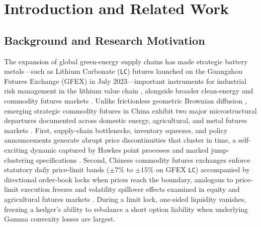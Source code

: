 \documentclass[11pt,a4paper]{article}
\begin{document}
\section{Introduction and Related Work}
\label{sec:intro}

\subsection{Background and Research Motivation}
The expansion of global green-energy supply chains has made strategic battery metals---such as Lithium Carbonate (\texttt{LC}) futures launched on the Guangzhou Futures Exchange (GFEX) in July 2023---important instruments for industrial risk management in the lithium value chain \citep{Kong2024,Wang2025}, alongside broader clean-energy and commodity futures markets \citep{Coskun2023}. Unlike frictionless geometric Brownian diffusion \citep{Black1976}, emerging strategic commodity futures in China exhibit two major microstructural departures documented across domestic energy, agricultural, and metal futures markets \citep{Naqvi2023,Geng2025}. First, supply-chain bottlenecks, inventory squeezes, and policy announcements generate abrupt price discontinuities \citep{Merton1976,Kou2002} that cluster in time, a self-exciting dynamic captured by Hawkes point processes \citep{Hawkes1971,Bacry2015,Brignone2023} and marked jump-clustering specifications \citep{ChenClements2024,Mercuri2024}. Second, Chinese commodity futures exchanges enforce statutory daily price-limit bands ($\pm 7\%$ to $\pm 15\%$ on GFEX \texttt{LC}) accompanied by directional order-book locks when prices reach the boundary, analogous to price-limit execution freezes and volatility spillover effects examined in equity and agricultural futures markets \citep{KimRhee1997,Zhang2023,Xia2024}. During a limit lock, one-sided liquidity vanishes, freezing a hedger's ability to rebalance a short option liability when underlying Gamma convexity losses are largest.
\end{document}
